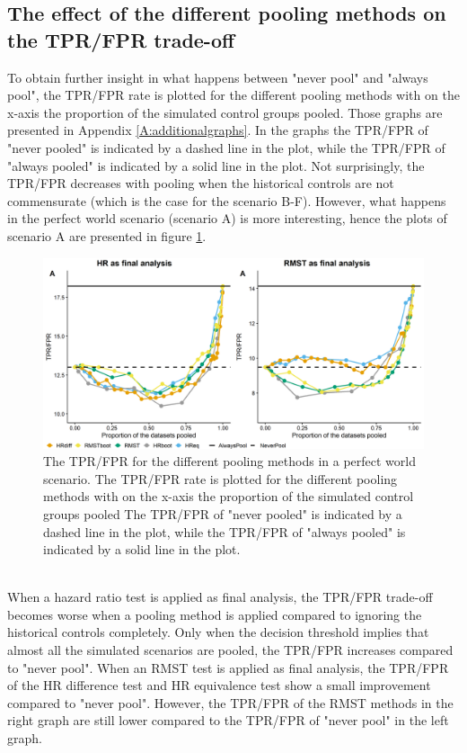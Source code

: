 \documentclass[Royal,sagev,times]{sagej}
\begin{document}
\subsection{The effect of the different pooling methods on the TPR/FPR trade-off}
To obtain further insight in what happens between "never pool" and "always pool", the TPR/FPR rate is plotted for the different pooling methods with on the x-axis the proportion of the simulated control groups pooled. Those graphs are presented in Appendix \ref{A:additionalgraphs}. In the graphs the TPR/FPR of "never pooled" is indicated by a dashed line in the plot, while the TPR/FPR of "always pooled" is indicated by a solid line in the plot. Not surprisingly, the TPR/FPR decreases with pooling when the historical controls are not commensurate (which is the case for the scenario B-F). However, what happens in the perfect world scenario (scenario A) is more interesting, hence the plots of scenario A are presented in figure \ref{fig:Aprop}. 
\begin{figure}[h!]
\includegraphics[width=12cm]{A.png}
  \caption{The TPR/FPR for the different pooling methods in a perfect world scenario. The TPR/FPR rate is plotted for the different pooling methods with on the x-axis the proportion of the simulated control groups pooled The TPR/FPR of "never pooled" is indicated by a dashed line in the plot, while the TPR/FPR of "always pooled" is indicated by a solid line in the plot.}
  \label{fig:Aprop}
\end{figure}
\\
When a hazard ratio test is applied as final analysis, the TPR/FPR trade-off becomes worse when a pooling method is applied compared to ignoring the historical controls completely. Only when the decision threshold implies that almost all the simulated scenarios are pooled, the TPR/FPR increases compared to "never pool". When an RMST test is applied as final analysis, the TPR/FPR of the HR difference test and HR equivalence test show a small improvement compared to "never pool". However, the TPR/FPR of the RMST methods in the right graph are still lower compared to the TPR/FPR of "never pool" in the left graph. 
\end{document}
